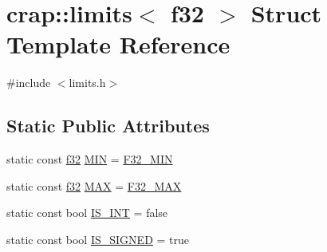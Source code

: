 \hypertarget{structcrap_1_1limits_3_01f32_01_4}{\section{crap\-:\-:limits$<$ f32 $>$ Struct Template Reference}
\label{structcrap_1_1limits_3_01f32_01_4}
}


{\ttfamily \#include $<$limits.\-h$>$}

\subsection*{Static Public Attributes}
\begin{DoxyCompactItemize}
\item 
static const \hyperlink{types_8h_a154db6eda6a99565cb060a1da4b4c930}{f32} \hyperlink{structcrap_1_1limits_3_01f32_01_4_abf95b25d77cebc19337b8e65709f837d}{M\-I\-N} = \hyperlink{types_8h_a0f9ce95191fb035fcd53ab63b9663e20}{F32\-\_\-\-M\-I\-N}
\item 
static const \hyperlink{types_8h_a154db6eda6a99565cb060a1da4b4c930}{f32} \hyperlink{structcrap_1_1limits_3_01f32_01_4_afea4f89ade14e316c4bb667d7647ca69}{M\-A\-X} = \hyperlink{types_8h_a754d8f564bd5d1fb49931b2f4c0ec00c}{F32\-\_\-\-M\-A\-X}
\item 
static const bool \hyperlink{structcrap_1_1limits_3_01f32_01_4_a131c2fe141a0c04d5140850158a0cf2d}{I\-S\-\_\-\-I\-N\-T} = false
\item 
static const bool \hyperlink{structcrap_1_1limits_3_01f32_01_4_a934f89c2f787b2d0f39a52ab4e0052b4}{I\-S\-\_\-\-S\-I\-G\-N\-E\-D} = true
\end{DoxyCompactItemize}


